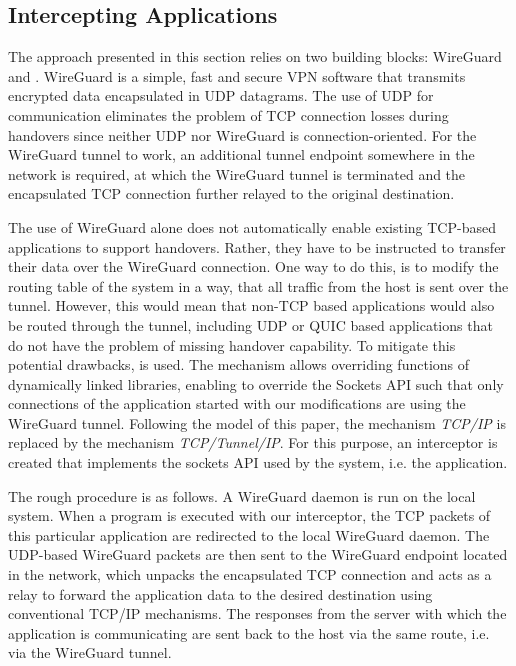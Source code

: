 \subsection{Intercepting Applications}
The approach presented in this section relies on two building blocks: WireGuard and \ld.
WireGuard is a simple, fast and secure VPN software that transmits encrypted data encapsulated in UDP datagrams.
The use of UDP for communication eliminates the problem of TCP connection losses during handovers since neither UDP nor WireGuard is connection-oriented.
For the WireGuard tunnel to work, an additional tunnel endpoint somewhere in the network is required, at which the WireGuard tunnel is terminated and the encapsulated TCP connection further relayed to the original destination.

The use of WireGuard alone does not automatically enable existing TCP-based applications to support handovers.
Rather, they have to be instructed to transfer their data over the WireGuard connection.
One way to do this, is to modify the routing table of the system in a way, that all traffic from the host is sent over the tunnel.
However, this would mean that non-TCP based applications would also be routed through the tunnel, including UDP or QUIC based applications that do not have the problem of missing handover capability.
To mitigate this potential drawbacks, \ld is used.
The \ld mechanism allows overriding functions of dynamically linked libraries, enabling to override the Sockets API such that only connections of the application started with our \ld modifications are using the WireGuard tunnel.
Following the model of this paper, the mechanism \emph{TCP/IP} is replaced by the mechanism \emph{TCP/Tunnel/IP}. 
For this purpose, an interceptor is created that implements the sockets API used by the system, i.e. the application.

The rough procedure is as follows.
A WireGuard daemon is run on the local system.
When a program is executed with our interceptor, the TCP packets of this particular application are redirected to the local WireGuard daemon.
The UDP-based WireGuard packets are then sent to the WireGuard endpoint located in the network, which unpacks the encapsulated TCP connection and acts as a relay to forward the application data to the desired destination using conventional TCP/IP mechanisms.
The responses from the server with which the application is communicating are sent back to the host via the same route, i.e. via the WireGuard tunnel.

